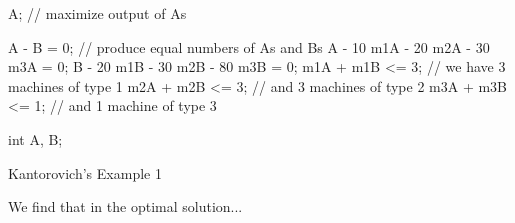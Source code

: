 \documentclass{article}
\begin{document}
\begin{script}[htbp]
  \label{ls:kantor}
\begin{scode}
A; // maximize output of As

A - B = 0; // produce equal numbers of As and Bs
A - 10 m1A - 20 m2A - 30 m3A = 0;
B - 20 m1B - 30 m2B - 80 m3B = 0;
m1A + m1B <= 3; // we have 3 machines of type 1
m2A + m2B <= 3; // and 3 machines of type 2
m3A + m3B <= 1; // and 1 machine of type 3

int A, B;
\end{scode}
  \caption{Kantorovich's Example 1}
\end{script}

We find that in the optimal solution...


\end{document}

